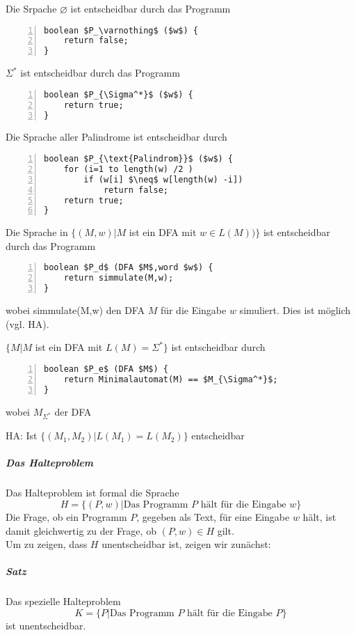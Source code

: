\documentclass[a4paper]{scrartcl}
\begin{document}
Die Srpache $\varnothing$ ist entscheidbar durch das Programm
\begin{lstlisting}[numbers=left, tabsize=4, style=customc,mathescape]
boolean $P_\varnothing$ ($w$) {
    return false;
}
\end{lstlisting}
$\Sigma^*$ ist entscheidbar durch das Programm
\begin{lstlisting}[numbers=left, tabsize=4, style=customc,mathescape]
boolean $P_{\Sigma^*}$ ($w$) {
    return true;
}
\end{lstlisting}
Die Sprache aller Palindrome ist entscheidbar durch
\begin{lstlisting}[numbers=left, tabsize=4, style=customc,mathescape]
boolean $P_{\text{Palindrom}}$ ($w$) {
    for (i=1 to length(w) /2 )
        if (w[i] $\neq$ w[length(w) -i])
            return false;
    return true;
}
\end{lstlisting}

Die Sprache in $\{ (M,w) | M$ ist ein DFA mit $w \in L(M))\}$ ist entscheidbar durch das Programm
\begin{lstlisting}[numbers=left, tabsize=4, style=customc,mathescape]
boolean $P_d$ (DFA $M$,word $w$) {
    return simmulate(M,w);
}
\end{lstlisting}
wobei simmulate(M,w) den DFA $M$ für die Eingabe $w$ simuliert. Dies ist möglich (vgl. HA).

$\{M | M$ ist ein DFA mit $L(M) = \Sigma^*\}$ ist entscheidbar durch
\begin{lstlisting}[numbers=left, tabsize=4, style=customc,mathescape]
boolean $P_e$ (DFA $M$) {
    return Minimalautomat(M) == $M_{\Sigma^*}$;
}
\end{lstlisting}
wobei $M_{\Sigma^*}$ der DFA 

HA: Ist $\{(M_1,M_2) |L(M_1) = L(M_2) \}$ entscheidbar


\subparagraph{Das Halteproblem}
Das Halteproblem ist formal die Sprache
\[ H = \{ (P,w) | \text{Das Programm } P \text{ hält für die Eingabe } w \} \]
Die Frage, ob ein Programm $P$, gegeben als Text, für eine Eingabe $w$ hält, ist damit gleichwertig zu der Frage, ob $(P,w) \in H$ gilt.\\
Um zu zeigen, dass $H$ unentscheidbar ist, zeigen wir zunächst:
\subparagraph{Satz} Das spezielle Halteproblem
\[ K = \{ P | \text{Das Programm } P \text{ hält für die Eingabe } P \}\]
ist unentscheidbar.
\end{document}

